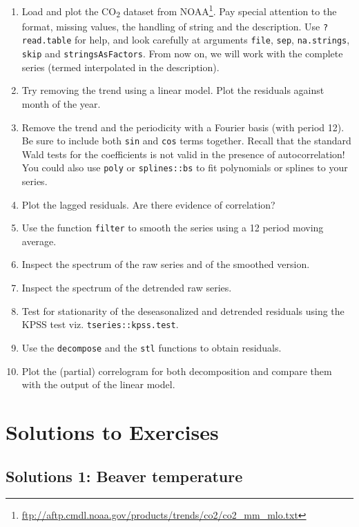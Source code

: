 \documentclass[]{book}
\providecommand{\tightlist}{%
  \setlength{\itemsep}{0pt}\setlength{\parskip}{0pt}}
\let\rmarkdownfootnote\footnote%
\def\footnote{\protect\rmarkdownfootnote}
\renewcommand{\href}[2]{#2\footnote{\url{#1}}}
\begin{document}
\begin{enumerate}
\def\labelenumi{\arabic{enumi}.}
\tightlist
\item
  Load and plot the CO\textsubscript{2} dataset from \href{ftp://aftp.cmdl.noaa.gov/products/trends/co2/co2_mm_mlo.txt}{NOAA}. Pay special attention to the format, missing values, the handling of string and the description. Use \texttt{?read.table} for help, and look carefully at arguments \texttt{file}, \texttt{sep}, \texttt{na.strings}, \texttt{skip} and \texttt{stringsAsFactors}. From now on, we will work with the complete series (termed interpolated in the description).
\item
  Try removing the trend using a linear model. Plot the residuals against month of the year.
\item
  Remove the trend and the periodicity with a Fourier basis (with period 12). Be sure to include both \texttt{sin} and \texttt{cos} terms together. Recall that the standard Wald tests for the coefficients is not valid in the presence of autocorrelation! You could also use \texttt{poly} or \texttt{splines::bs} to fit polynomials or splines to your series.
\item
  Plot the lagged residuals. Are there evidence of correlation?
\item
  Use the function \texttt{filter} to smooth the series using a 12 period moving average.
\item
  Inspect the spectrum of the raw series and of the smoothed version.
\item
  Inspect the spectrum of the detrended raw series.
\item
  Test for stationarity of the deseasonalized and detrended residuals using the KPSS test viz. \texttt{tseries::kpss.test}.
\item
  Use the \texttt{decompose} and the \texttt{stl} functions to obtain residuals.
\item
  Plot the (partial) correlogram for both decomposition and compare them with the output of the linear model.
\end{enumerate}

\hypertarget{solutions-to-exercises}{%
\section{Solutions to Exercises}\label{solutions-to-exercises}}

\hypertarget{solutions-1-beaver-temperature}{%
\subsection{Solutions 1: Beaver temperature}\label{solutions-1-beaver-temperature}}
\end{document}
